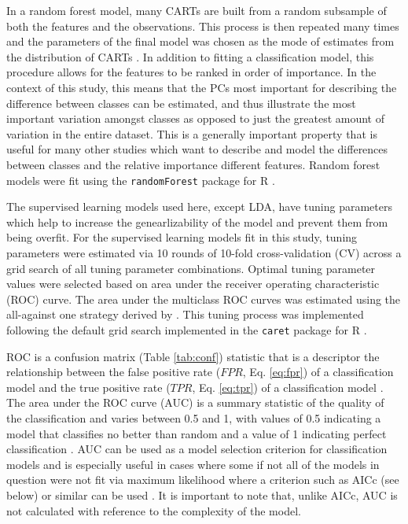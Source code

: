 \documentclass[12pt,letterpaper]{article}\usepackage{graphicx, color}
\begin{document}
In a random forest model, many CARTs are built from a random subsample of both the features and the observations. This process is then repeated many times and the parameters of the final model was chosen as the mode of estimates from the distribution of CARTs \citep{Breiman2001}. In addition to fitting a classification model, this procedure allows for the features to be ranked in order of importance. In the context of this study, this means that the PCs most important for describing the difference between classes can be estimated, and thus illustrate the most important variation amongst classes as opposed to just the greatest amount of variation in the entire dataset. This is a generally important property that is useful for many other studies which want to describe and model the differences between classes and the relative importance different features. Random forest models were fit using the \texttt{randomForest} package for R \citep{Liaw2002}.


The supervised learning models used here, except LDA, have tuning parameters which help to increase the genearlizability of the model and prevent them from being overfit. For the supervised learning models fit in this study, tuning parameters were estimated via 10 rounds of 10-fold cross-validation (CV) across a grid search of all tuning parameter combinations. Optimal tuning parameter values were selected based on area under the receiver operating characteristic (ROC) curve. The area under the multiclass ROC curves was estimated using the all-against one strategy derived by \citet{Hand2001}. This tuning process was implemented following the default grid search implemented in the \texttt{caret} package for R \citep{Kuhn2013}.


ROC is a confusion matrix (Table \ref{tab:conf}) statistic that is a descriptor the relationship between the false positive rate (\(FPR\), Eq. \ref{eq:fpr}) of a classification model and the true positive rate (\(TPR\), Eq. \ref{eq:tpr}) of a classification model \citep{Hastie2009}. 
The area under the ROC curve (AUC) is a summary statistic of the quality of the classification and varies between 0.5 and 1, with values of 0.5 indicating a model that classifies no better than random and a value of 1 indicating perfect classification \citep{Hastie2009}. AUC can be used as a model selection criterion for classification models and is especially useful in cases where some if not all of the models in question were not fit via maximum likelihood where a criterion such as AICc (see below) or similar can be used \citep{Hastie2009}. It is important to note that, unlike AICc, AUC is not calculated with reference to the complexity of the model.
\end{document}
